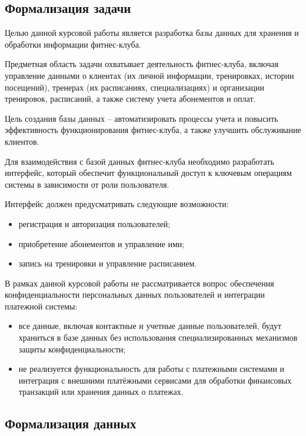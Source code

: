 \subsection{Формализация задачи}

Целью данной курсовой работы является разработка базы данных для хранения и обработки информации фитнес-клуба. 

Предметная область задачи охватывает деятельность фитнес-клуба, включая управление данными о клиентах (их личной информации, тренировках, истории посещений), тренерах (их расписаниях, специализациях) и организации тренировок, расписаний, а также систему учета абонементов и оплат. 

Цель создания базы данных -- автоматизировать процессы учета и повысить эффективность функционирования фитнес-клуба, а также улучшить обслуживание клиентов.

Для взаимодействия с базой данных фитнес-клуба необходимо разработать интерфейс, который обеспечит функциональный доступ к ключевым операциям системы в зависимости от роли пользователя.

Интерфейс должен предусматривать следующие возможности:
\begin{itemize}
	\item регистрация и авторизация пользователей;
	\item приобретение абонементов и управление ими;
	\item запись на тренировки и управление расписанием.
\end{itemize}

В рамках данной курсовой работы не рассматривается вопрос обеспечения конфиденциальности персональных данных пользователей и интеграции платежной системы:
\begin{itemize}
	\item все данные, включая контактные и учетные данные пользователей, будут храниться в базе данных без использования специализированных механизмов защиты конфиденциальности;
	\item не реализуется функциональность для работы с платежными системами и интеграция с внешними платёжными сервисами для обработки финансовых транзакций или хранения данных о платежах.
\end{itemize}

\newpage
\subsection{Формализация данных}

